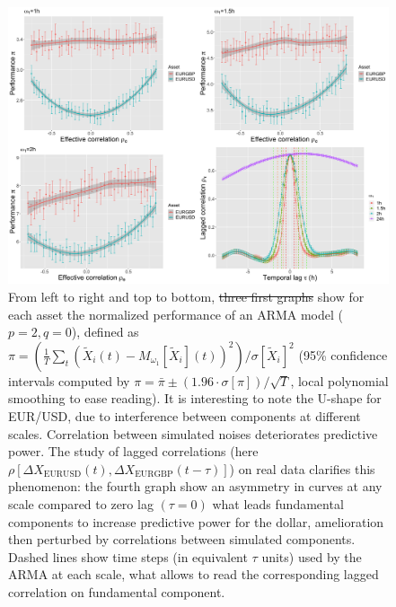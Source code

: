 \documentclass{bmcart}
\providecommand{\DIFaddtex}[1]{{\protect\color{blue}\uwave{#1}}} %
\providecommand{\DIFdeltex}[1]{{\protect\color{red}\sout{#1}}}                      %
\providecommand{\DIFaddFL}[1]{\DIFadd{#1}} %
\providecommand{\DIFdelFL}[1]{\DIFdel{#1}} %
\providecommand{\DIFaddbeginFL}{} %
\providecommand{\DIFaddendFL}{} %
\providecommand{\DIFdelbeginFL}{} %
\providecommand{\DIFdelendFL}{} %
\providecommand{\DIFadd}[1]{\texorpdfstring{\DIFaddtex{#1}}{#1}} %
\providecommand{\DIFdel}[1]{\texorpdfstring{\DIFdeltex{#1}}{}} %
\newcommand{\DIFscaledelfig}{0.5}
\newlength{\DIFdelgraphicswidth} %
\newlength{\DIFdelgraphicsheight} %
\newcommand{\DIFaddincludegraphics}[2][]{{\color{blue}\fbox{\DIFOincludegraphics[#1]{#2}}}} %
\newcommand{\DIFdelincludegraphics}[2][]{%
\sbox{\DIFdelgraphicsbox}{\DIFOincludegraphics[#1]{#2}}%
\settoboxwidth{\DIFdelgraphicswidth}{\DIFdelgraphicsbox} %
\settoboxtotalheight{\DIFdelgraphicsheight}{\DIFdelgraphicsbox} %
\scalebox{\DIFscaledelfig}{%
\parbox[b]{\DIFdelgraphicswidth}{\usebox{\DIFdelgraphicsbox}\\[-\baselineskip] \rule{\DIFdelgraphicswidth}{0em}}\llap{\resizebox{\DIFdelgraphicswidth}{\DIFdelgraphicsheight}{%
\setlength{\unitlength}{\DIFdelgraphicswidth}%
\begin{picture}(1,1)%
\thicklines\linethickness{2pt} %
{\color[rgb]{1,0,0}\put(0,0){\framebox(1,1){}}}%
{\color[rgb]{1,0,0}\put(0,0){\line( 1,1){1}}}%
{\color[rgb]{1,0,0}\put(0,1){\line(1,-1){1}}}%
\end{picture}%
}\hspace*{3pt}}} %
} %
\DeclareRobustCommand{\DIFaddbeginFL}{\DIFOaddbeginFL \let\includegraphics\DIFaddincludegraphics} %
\DeclareRobustCommand{\DIFaddendFL}{\DIFOaddendFL \let\includegraphics\DIFOincludegraphics} %
\DeclareRobustCommand{\DIFdelbeginFL}{\DIFOdelbeginFL \let\includegraphics\DIFdelincludegraphics} %
\DeclareRobustCommand{\DIFdelendFL}{\DIFOaddendFL \let\includegraphics\DIFOincludegraphics} %
\begin{document}
\begin{figure}[h!]
\DIFdelbeginFL %
\DIFdelendFL \DIFaddbeginFL \includegraphics[width=\linewidth]{figures/Fig5.png}
\DIFaddendFL \caption{ From left to right and top to bottom, \DIFdelbeginFL \DIFdelFL{three first graphs }\DIFdelendFL \DIFaddbeginFL \DIFaddFL{the plots }\DIFaddendFL show for each asset the normalized performance of an ARMA model ($p=2,q=0$), defined as $\pi = \left(\frac{1}{T}\sum_t\left(\tilde{X}_i(t) - M_{\omega_1}\left[\tilde{X}_i\right](t)\right)^2 \right) / \sigma \left[ \tilde{X}_i \right]^2$ (95\% confidence intervals computed by $\pi = \bar{\pi} \pm (1.96\cdot \sigma [\pi])/\sqrt{T}$, local polynomial smoothing to ease reading). It is interesting to note the U-shape for EUR/USD, due to interference between components at different scales. Correlation between simulated noises deteriorates predictive power. The study of lagged correlations (here $\rho [\Delta X_{\textrm{EURUSD}}(t),\Delta X_{\textrm{EURGBP}}(t-\tau)]$) on real data clarifies this phenomenon: the fourth graph show an asymmetry in curves at any scale compared to zero lag $(\tau = 0)$ what leads fundamental components to increase predictive power for the dollar, amelioration then perturbed by correlations between simulated components. Dashed lines show time steps (in equivalent $\tau$ units) used by the ARMA at each scale, what allows to read the corresponding lagged correlation on fundamental component.\label{fig:model_perf}}
\end{figure}
\end{document}
